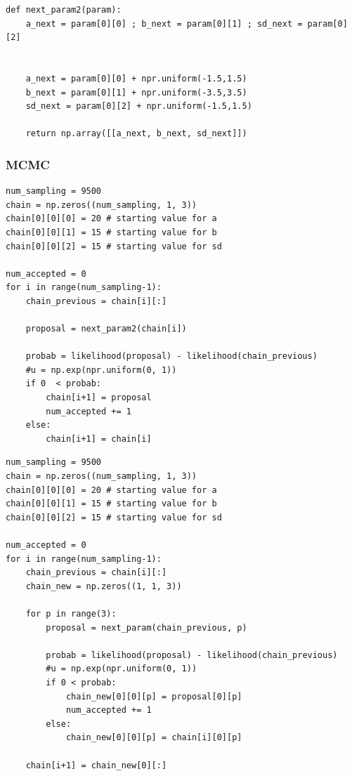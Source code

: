 \documentclass[a4paper,10.5pt,uplatex]{jsarticle}  %
\begin{document}
\begin{lstlisting}[caption={Draw all parameters at the same tine}]
def next_param2(param):
    a_next = param[0][0] ; b_next = param[0][1] ; sd_next = param[0][2]


    a_next = param[0][0] + npr.uniform(-1.5,1.5)
    b_next = param[0][1] + npr.uniform(-3.5,3.5)
    sd_next = param[0][2] + npr.uniform(-1.5,1.5)

    return np.array([[a_next, b_next, sd_next]])
\end{lstlisting}

\subsubsection{MCMC}
\begin{lstlisting}[caption={Component-wise Sampling}]
num_sampling = 9500
chain = np.zeros((num_sampling, 1, 3))
chain[0][0][0] = 20 # starting value for a
chain[0][0][1] = 15 # starting value for b
chain[0][0][2] = 15 # starting value for sd

num_accepted = 0
for i in range(num_sampling-1):
    chain_previous = chain[i][:]
    
    proposal = next_param2(chain[i])

    probab = likelihood(proposal) - likelihood(chain_previous)
    #u = np.exp(npr.uniform(0, 1))
    if 0  < probab:
        chain[i+1] = proposal
        num_accepted += 1
    else:
        chain[i+1] = chain[i]
\end{lstlisting}

\begin{lstlisting}[caption={Block-wise Sampling}]
num_sampling = 9500
chain = np.zeros((num_sampling, 1, 3))
chain[0][0][0] = 20 # starting value for a
chain[0][0][1] = 15 # starting value for b
chain[0][0][2] = 15 # starting value for sd

num_accepted = 0
for i in range(num_sampling-1):
    chain_previous = chain[i][:]
    chain_new = np.zeros((1, 1, 3))
    
    for p in range(3):
        proposal = next_param(chain_previous, p)
        
        probab = likelihood(proposal) - likelihood(chain_previous)
        #u = np.exp(npr.uniform(0, 1))
        if 0 < probab:
            chain_new[0][0][p] = proposal[0][p]
            num_accepted += 1
        else:
            chain_new[0][0][p] = chain[i][0][p]
            
    chain[i+1] = chain_new[0][:]
\end{lstlisting}
\end{document}
